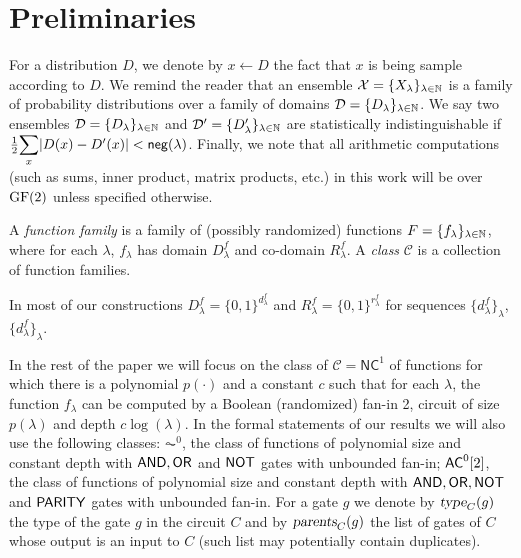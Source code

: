 \section{Preliminaries}
\label{sec:prelim}




For a distribution $D$, we denote by $x \gets D$ the fact that $x$ is being sample according to $D$.
We remind the reader that an ensemble $\mathcal{X} = \{X_{\lambda}\}_{\lambda\in\mathbb{N}}$ is a family of  probability distributions over a family of domains $\mathcal{D}=\{D_{\lambda}\}_{\lambda\in\mathbb{N}}$. We say two ensembles $\mathcal{D} = \{D_{\lambda}\}_{\lambda\in\mathbb{N}}$ and $\mathcal{D}' = \{D'_{\lambda}\}_{\lambda\in\mathbb{N}}$ are statistically indistinguishable if $\frac{1}{2}\Sum_x |D(x)-D'(x)| < \negl(\lambda)$. 
Finally, we note that all arithmetic computations (such as sums, inner product, matrix products, etc.) in this work will be over $\text{GF}(2)$ unless specified otherwise.

\begin{definition}
A {\em function family} is a family of (possibly randomized) functions $F = \{f_{\lambda}\}_{\lambda\in\mathbb{N}}$, where for each $\lambda$, $f_{\lambda}$ has domain $D^f_{\lambda}$ and co-domain $R^f_{\lambda}$. A {\em class} $\mathcal{C}$ 
is a collection of function families. 
\end{definition}
In most of our constructions $D^f_{\lambda}=\{0,1\}^{d_\lambda^f}$ and $R^f_{\lambda}=\{0,1\}^{r_\lambda^f}$ for sequences $\{d_\lambda^f\}_\lambda$, 
$\{d_\lambda^f\}_\lambda$. 

In the rest of the paper we will focus on the class of $\mathcal{C}=\mathsf{NC}^1$ of functions for which there is a polynomial $p(\cdot)$ and a constant $c$ such that for each $\lambda$, the function $f_\lambda$ can be computed by a Boolean (randomized) fan-in 2, circuit of size $p(\lambda)$ and depth $c \log(\lambda)$. In the formal statements of our results we will also use the following classes: $\AC^0$, the class of functions of polynomial size and constant depth with $\mathsf{AND}, \mathsf{OR}$ and $\mathsf{NOT}$ gates with unbounded fan-in; ${\mathsf{AC}}^0[2]$, the class of functions of polynomial size and constant depth with $\mathsf{AND}, \mathsf{OR}, \mathsf{NOT}$ and $\mathsf{PARITY}$ gates with unbounded fan-in. For a gate $g$ we denote by ${\textsl{type}}_C(g)$ the type of the gate $g$ in the circuit $C$ and by ${\textsl{parents}}_C(g)$ the list of gates of $C$ whose output is an input to $C$ (such list may potentially contain duplicates). 

